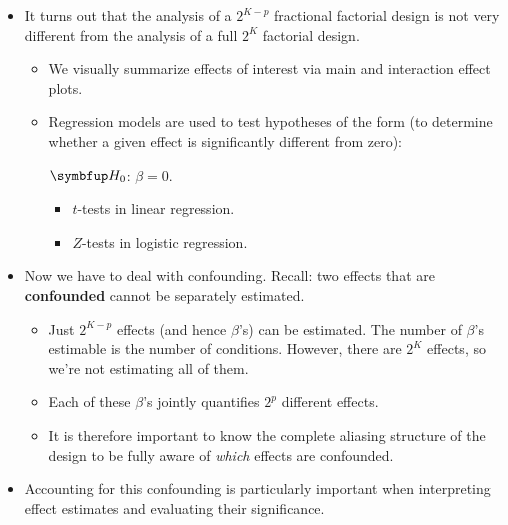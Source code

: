 \begin{itemize}
      \item It turns out that the analysis of a $ 2^{K-p} $ fractional factorial design is not very different from the analysis
            of a full $2^K$ factorial design.
            \begin{itemize}
                  \item We visually summarize effects of interest via main and interaction effect plots.
                  \item Regression models are used to test hypotheses of the form (to determine whether a given effect is significantly different from zero):
                        \begin{tightcenter}
                              $ \HN $: $ \beta=0 $.
                        \end{tightcenter}
                        \begin{itemize}[$\rightarrow$]
                              \item $ t $-tests in linear regression.
                              \item $ Z $-tests in logistic regression.
                        \end{itemize}
            \end{itemize}
      \item Now we have to deal with confounding. Recall: two effects that are \textbf{confounded} cannot be separately
            estimated.
            \begin{itemize}[$\rightarrow$]
                  \item Just $ 2^{K-p} $ effects (and hence $ \beta $'s) can be estimated. The number of $ \beta $'s estimable is the number of conditions.
                        However, there are $ 2^K $ effects, so we're not estimating all of them.
                  \item Each of these $ \beta $'s jointly quantifies $ 2^p $ different effects.
            \end{itemize}
            \begin{itemize}
                  \item It is therefore important to know the complete aliasing structure of the design to be fully
                        aware of \emph{which} effects are confounded.
            \end{itemize}
      \item Accounting for this confounding is particularly important when interpreting effect estimates and evaluating their significance.

\end{itemize}
